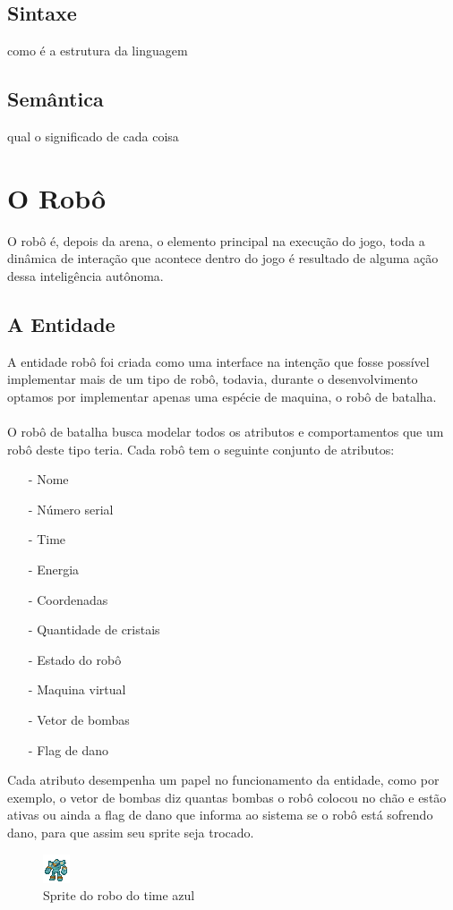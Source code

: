 \documentclass[a4paper]{article}
\begin{document}
\subsection{Sintaxe}
como é a estrutura da linguagem
\subsection{Semântica}
qual o significado de cada coisa

\section{O Robô}
O robô é, depois da arena, o elemento principal na execução do jogo, toda a dinâmica de interação que acontece dentro do jogo é resultado de alguma ação dessa inteligência autônoma. 
\subsection{A Entidade}
A entidade robô foi criada como uma interface na intenção que fosse possível implementar mais de um tipo de robô, todavia, durante o desenvolvimento optamos por implementar apenas uma espécie de maquina, o robô de batalha.\\\\
O robô de batalha busca modelar todos os atributos e comportamentos que um robô deste tipo teria. Cada robô tem o seguinte conjunto de atributos:

\begin{itemize}
\item[-]{Nome}
\item[-]{Número serial}
\item[-]{Time}
\item[-]{Energia}
\item[-]{Coordenadas}
\item[-]{Quantidade de cristais}
\item[-]{Estado do robô}
\item[-]{Maquina virtual}
\item[-]{Vetor de bombas}
\item[-]{Flag de dano}
\end{itemize}
Cada atributo desempenha um papel no funcionamento da entidade, como por exemplo, o vetor de bombas diz quantas bombas o robô colocou no chão e estão ativas ou ainda a flag de dano que informa ao sistema se o robô está sofrendo dano, para que assim seu sprite seja trocado.

\begin{figure}[htb]
\begin{center}
\includegraphics[scale=1]{images/roboA3.png}
\caption{Sprite do robo do time azul}
\end{center}
\end{figure}
\end{document}
